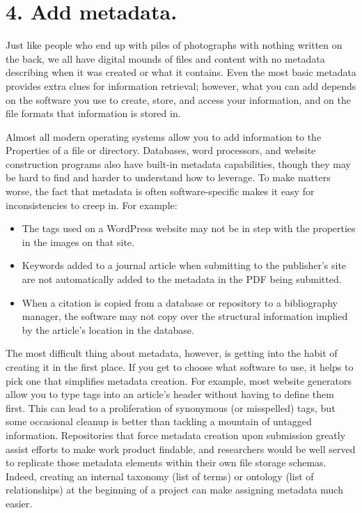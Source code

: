 \documentclass[10pt,letterpaper]{article}
\newcommand{\rulemajor}[1]{\section*{#1}}
\begin{document}
\rulemajor{4. Add metadata.}

Just like people who end up with piles of photographs with nothing written on
the back, we all have digital mounds of files and content with no metadata
describing when it was created or what it contains. Even the most basic
metadata provides extra clues for information retrieval; however, what you can
add depends on the software you use to create, store, and access your
information, and on the file formats that information is stored in.

Almost all modern operating systems allow you to add information to the
Properties of a file or directory. Databases, word processors, and website
construction programs also have built-in metadata capabilities, though they may
be hard to find and harder to understand how to leverage. To make matters
worse, the fact that metadata is often software-specific makes it easy for
inconsistencies to creep in. For example:

\begin{itemize}

\item
  The tags used on a WordPress website may not be in step with the properties in
  the images on that site.

\item
  Keywords added to a journal article when submitting to the publisher's site
  are not automatically added to the metadata in the PDF being submitted.

\item
  When a citation is copied from a database or repository to a bibliography
  manager, the software may not copy over the structural information implied by
  the article's location in the database.

\end{itemize}

The most difficult thing about metadata, however, is getting into the habit of
creating it in the first place. If you get to choose what software to use, it
helps to pick one that simplifies metadata creation. For example, most website
generators allow you to type tags into an article's header without having to
define them first. This can lead to a proliferation of synonymous (or
misspelled) tags, but some occasional cleanup is better than tackling a mountain
of untagged information. Repositories that force metadata creation upon
submission greatly assist efforts to make work product findable, and researchers
would be well served to replicate those metadata elements within their own file
storage schemas. Indeed, creating an internal taxonomy (list of terms) or
ontology (list of relationships) at the beginning of a project can make
assigning metadata much easier.
\end{document}
